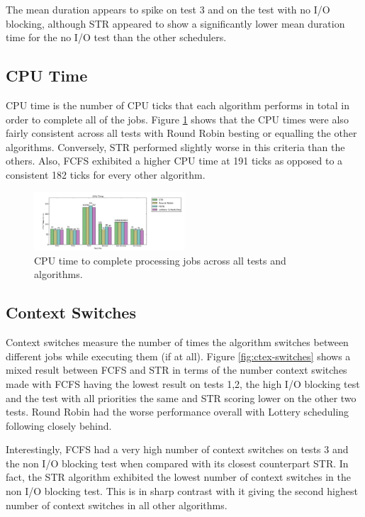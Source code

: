 \documentclass{acm_proc_article-sp}
\begin{document}
The mean duration appears to spike on test 3 and on the test with no I/O blocking, although STR appeared to show a significantly lower mean duration time for the no I/O test than the other schedulers.

\subsection{CPU Time}
CPU time is the number of CPU ticks that each algorithm performs in total in order to complete all of the jobs. Figure \ref{fig:cpu-time} shows that the CPU times were also fairly consistent across all tests with Round Robin besting or equalling the other algorithms. Conversely, STR performed slightly worse in this criteria than the others. Also, FCFS exhibited a higher CPU time at 191 ticks as opposed to a consistent 182 ticks for every other algorithm. 

\begin{figure}[H]
\centering
\includegraphics[width=0.5\textwidth]{cpu_time.png}
\caption{CPU time to complete processing jobs across all tests and algorithms.}
\label{fig:cpu-time}
\end{figure}

\subsection{Context Switches}
Context switches measure the number of times the algorithm switches between different jobs while executing them (if at all). Figure \ref{fig:ctex-switches} shows a mixed result between FCFS and STR in terms of the number context switches made with FCFS having the lowest result on tests 1,2, the high I/O blocking test and the test with all priorities the same and STR scoring lower on the other two tests. Round Robin had the worse performance overall with Lottery scheduling following closely behind. 

Interestingly, FCFS had a very high number of context switches on tests 3 and the non I/O blocking test when compared with its closest counterpart STR. In fact, the STR algorithm exhibited the lowest number of context switches in the non I/O blocking test. This is in sharp contrast with it giving the second highest number of context switches in all other algorithms.
\end{document}
